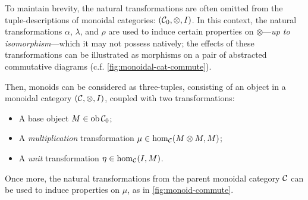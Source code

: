 \documentclass[10pt,a4paper,reqno]{amsart}
\numberwithin{equation}{section}
\numberwithin{figure}{section}
\begin{document}
To maintain brevity, the natural transformations are often omitted from the
tuple-descriptions of monoidal categories: $(\mathcal{C}_0, \otimes, I)$. In this
context, the natural transformations $\alpha$, $\lambda$, and $\rho$ are used to
induce certain properties on $\otimes$---\emph{up to isomorphism}---which it
may not possess natively; the effects of these transformations can be
illustrated as morphisms on a pair of abstracted commutative diagrams (c.f.
\autoref{fig:monoidal-cat-commute}).

Then, monoids can be considered as three-tuples, consisting of an object in a
monoidal category $(\mathcal{C}, \otimes, I)$, coupled with two transformations:
\begin{itemize}
        \item A base object $M \in \operatorname{ob} \mathcal{C}_0$;
        \item A \emph{multiplication} transformation $\mu \in \hom_\mathcal{C}
        (M \otimes M, M)$;
        \item A \emph{unit} transformation $\eta \in \hom_\mathcal{C} (I, M)$.
\end{itemize}
Once more, the natural transformations from the parent monoidal category
$\mathcal{C}$ can be used to induce properties on $\mu$, as in
\autoref{fig:monoid-commute}.
\end{document}
